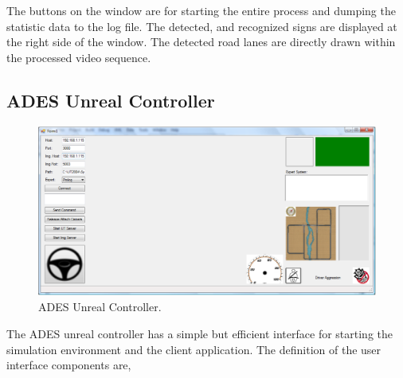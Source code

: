 \documentclass[a4paper,oneside,12pt]{report}
\begin{document}
The buttons on the window are for starting the entire process and dumping the statistic data to the log file. The detected, and recognized signs are displayed at the right side of the window. The detected road lanes are directly drawn within the processed video sequence.

\subsection{ADES Unreal Controller}
\begin{figure}
\begin{center}
\includegraphics[width=140mm]{img/adesunrealapp.eps}
\caption{ADES Unreal Controller.}
\label{fig:adesunrealapp}
\end{center}
\end{figure}
The ADES unreal controller has a simple but efficient interface for starting the simulation environment and the client application. The definition of the user interface components are,
\end{document}
